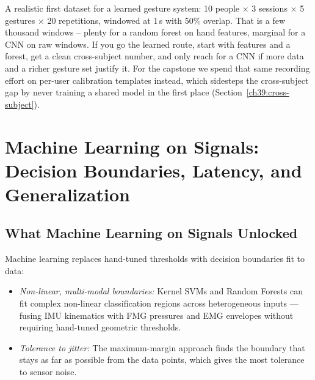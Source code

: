 \begin{goalbox}
A realistic first dataset for a learned gesture system: 10 people $\times$ 3 sessions
$\times$ 5 gestures $\times$ 20 repetitions, windowed at 1\,s with 50\% overlap. That is a
few thousand windows -- plenty for a random forest on hand features, marginal for a CNN on
raw windows. If you go the learned route, start with features and a forest, get a clean
cross-subject number, and only reach for a CNN if more data and a richer gesture set
justify it. For the capstone we spend that same recording effort on per-user calibration
templates instead, which sidesteps the cross-subject gap by never training a shared model
in the first place (Section~\ref{ch39:cross-subject}).
\end{goalbox}

\section{Machine Learning on Signals: Decision Boundaries, Latency, and Generalization}
\label{ch39:capabilities-limits}

\subsection{What Machine Learning on Signals Unlocked}
Machine learning replaces hand-tuned thresholds with decision boundaries fit to data:
\begin{itemize}
  \item \emph{Non-linear, multi-modal boundaries:} Kernel SVMs and Random Forests can fit complex non-linear classification regions across heterogeneous inputs --- fusing IMU kinematics with FMG pressures and EMG envelopes without requiring hand-tuned geometric thresholds.
  \item \emph{Tolerance to jitter:} The maximum-margin approach finds the boundary that stays as far as possible from the data points, which gives the most tolerance to sensor noise.
\end{itemize}

